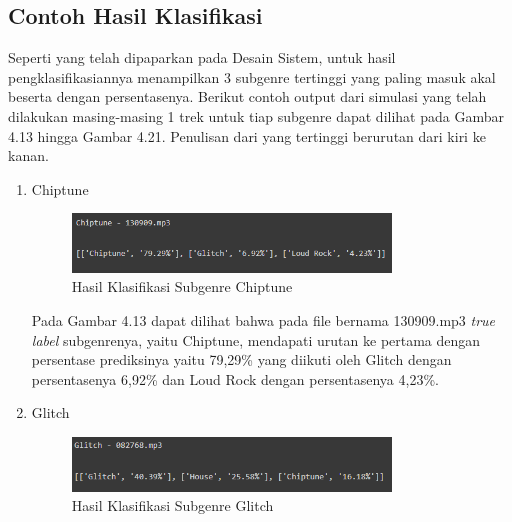 \subsection{Contoh Hasil Klasifikasi}
\label{subsec:contohklasifikasi}

Seperti yang telah dipaparkan pada Desain Sistem, untuk hasil pengklasifikasiannya menampilkan 3 subgenre tertinggi yang paling masuk akal beserta dengan persentasenya. Berikut contoh output dari simulasi yang telah dilakukan masing-masing 1 trek untuk tiap subgenre dapat dilihat pada Gambar 4.13 hingga Gambar 4.21. Penulisan dari yang tertinggi berurutan dari kiri ke kanan.

\begin{enumerate}
	\item Chiptune
	
	\begin{figure}[H]
		\centering
		
		\includegraphics[width=0.8\textwidth]{gambar/classification_chiptune}
		
		\caption{Hasil Klasifikasi Subgenre Chiptune}
		\label{fig:klas_chiptune}
	\end{figure}
	
	Pada Gambar 4.13 dapat dilihat bahwa pada file bernama 130909.mp3 \emph{true label} subgenrenya, yaitu Chiptune, mendapati urutan ke pertama dengan persentase prediksinya yaitu 79,29\% yang diikuti oleh Glitch dengan persentasenya 6,92\% dan Loud Rock dengan persentasenya 4,23\%.
	
	\item Glitch
	
	\begin{figure}[H]
		\centering
		
		\includegraphics[width=0.8\textwidth]{gambar/classification_glitch}
		
		\caption{Hasil Klasifikasi Subgenre Glitch}
		\label{fig:klas_glitch}
	\end{figure}
	

\end{enumerate}
